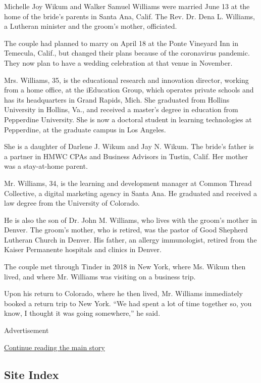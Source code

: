 Michelle Joy Wikum and Walker Samuel Williams were married June 13 at
the home of the bride's parents in Santa Ana, Calif. The Rev. Dr. Dena
L. Williams, a Lutheran minister and the groom's mother, officiated.

The couple had planned to marry on April 18 at the Ponte Vineyard Inn in
Temecula, Calif., but changed their plans because of the coronavirus
pandemic. They now plan to have a wedding celebration at that venue in
November.

Mrs. Williams, 35, is the educational research and innovation director,
working from a home office, at the iEducation Group, which operates
private schools and has its headquarters in Grand Rapids, Mich. She
graduated from Hollins University in Hollins, Va., and received a
master's degree in education from Pepperdine University. She is now a
doctoral student in learning technologies at Pepperdine, at the graduate
campus in Los Angeles.

She is a daughter of Darlene J. Wikum and Jay N. Wikum. The bride's
father is a partner in HMWC CPAs and Business Advisors in Tustin, Calif.
Her mother was a stay-at-home parent.

Mr. Williams, 34, is the learning and development manager at Common
Thread Collective, a digital marketing agency in Santa Ana. He graduated
and received a law degree from the University of Colorado.

He is also the son of Dr. John M. Williams, who lives with the groom's
mother in Denver. The groom's mother, who is retired, was the pastor of
Good Shepherd Lutheran Church in Denver. His father, an allergy
immunologist, retired from the Kaiser Permanente hospitals and clinics
in Denver.

The couple met through Tinder in 2018 in New York, where Ms. Wikum then
lived, and where Mr. Williams was visiting on a business trip.

Upon his return to Colorado, where he then lived, Mr. Williams
immediately booked a return trip to New York. ``We had spent a lot of
time together so, you know, I thought it was going somewhere,'' he said.

Advertisement

\protect\hyperlink{after-bottom}{Continue reading the main story}

\hypertarget{site-index}{%
\subsection{Site Index}\label{site-index}}

